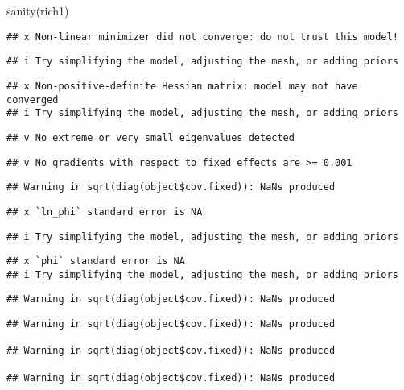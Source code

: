 \documentclass[
]{article}
\newenvironment{Shaded}{\begin{snugshade}}{\end{snugshade}}
\newcommand{\FunctionTok}[1]{\textcolor[rgb]{0.00,0.00,0.00}{#1}}
\newcommand{\NormalTok}[1]{#1}
\begin{document}
\begin{Shaded}
\begin{Highlighting}[]
\FunctionTok{sanity}\NormalTok{(rich1)}
\end{Highlighting}
\end{Shaded}

\begin{verbatim}
## x Non-linear minimizer did not converge: do not trust this model!
\end{verbatim}

\begin{verbatim}
## i Try simplifying the model, adjusting the mesh, or adding priors
\end{verbatim}

\begin{verbatim}
## x Non-positive-definite Hessian matrix: model may not have converged
## i Try simplifying the model, adjusting the mesh, or adding priors
\end{verbatim}

\begin{verbatim}
## v No extreme or very small eigenvalues detected
\end{verbatim}

\begin{verbatim}
## v No gradients with respect to fixed effects are >= 0.001
\end{verbatim}

\begin{verbatim}
## Warning in sqrt(diag(object$cov.fixed)): NaNs produced
\end{verbatim}

\begin{verbatim}
## x `ln_phi` standard error is NA
\end{verbatim}

\begin{verbatim}
## i Try simplifying the model, adjusting the mesh, or adding priors
\end{verbatim}

\begin{verbatim}
## x `phi` standard error is NA
## i Try simplifying the model, adjusting the mesh, or adding priors
\end{verbatim}

\begin{verbatim}
## Warning in sqrt(diag(object$cov.fixed)): NaNs produced
\end{verbatim}

\begin{verbatim}
## Warning in sqrt(diag(object$cov.fixed)): NaNs produced

## Warning in sqrt(diag(object$cov.fixed)): NaNs produced

## Warning in sqrt(diag(object$cov.fixed)): NaNs produced
\end{verbatim}
\end{document}
